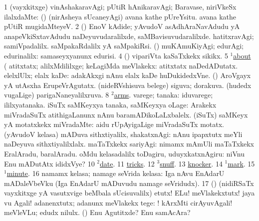 \noindent
\gl{\pagu}
\expl{}
\bmng
\bnum
\num{1}  (vayxkitxge) vinAshakaravAgi; pUtiR hAnikaravAgi; Baravase, niriVkeSx ilalxdaMte:  (\AmA) (nirAsheya sUcaneyAgi) avana kathe pUreYsitu. avana kathe pUtiR mugidaMteyeV. 
\num{2}  (\AmA) EnoV kAdide; yAvudoV asAdhAraNavAdudu yA anapeVkiSxtavAdudu naDeyuvudaralilxde, saMBavisuvudaralilxde. 
  
\banum
{} hatitxravAgi; samiVpadalilx. 
 saMpakaRdalilx yA saMpakiRsi. 
 (\AmA) muKAmuKiyAgi; edurAgi; edurinalilx:  samaseyxyanunx edurisi. 
\eanum
\numie
\num{4}  (\AmA) vipariVta kaSaTxkekx sikikx. 
\num{5}  \hyperref{kandict_a.pdf}{A}{about(1) nuga(6)}{$^1$about} (  
  
\banum
{} atitxtatx; alilxMdililxge; keLagiMda meVlakekx:  atitxtatx naDedADutatx. 
 elelxlUlx; elalx kaDe:  adakAkxgi nAnu elalx kaDe huDukidedxVne. 
 (\AmA) AroVgayx yA utAsxha ErupeVrAgutatx. 
\eanum
\numie
{}  
\banum
{} (nideRVshisuva belege) siguva; dorakuva. 
 (hudedx \mo vugaLige) parigaNaneyalilxruva. 
\eanum
\numie
\num{8}  \hyperref{kandict_a.pdf}{A}{arms(2) nuga(5)}{$^2$arms}. 
\banum
{} varege; tanaka:  iduvarege; ililxyatanaka. 
 iSuTx saMKeyxya tanaka, saMKeyxya oLage:  Arakekx miVradaSuTx atithigaLanunx nAnu baramADikoLaLxbalelx. 
 (iSuTx) saMKeyx yA motatxkekx miVradaMte:  aidu rUpAyigaLige miVradaSuTx motatx. 
 (yAvudoV kelasa) mADuva sithxtiyalilx, shakatxnAgi:  nAnu ipapxtutx meYli naDeyuva sithxtiyalilxlalx. 
 maTaTxkekx sariyAgi:  nimamx mAmUli maTaTxkekx EralAradu, baralAradu. 
 oMdu kelasadalilx toDagiru, uduyxkatxnAgiru:  niVnu Enu mADutAtx ididxVye? 
\eanum
\numie
\num{10}  \hyperref{kandict_d.pdf}{D}{date(2) nuga(3)}{$^2$date}. 
\num{11}  \hyperref{kandict_t.pdf}{T}{trick pagu(7)}{tricks}. 
\num{12}  \hyperref{kandict_s.pdf}{S}{snuff(3) pagu(3)}{$^3$snuff}. 
\num{13}  \hyperref{kandict_k.pdf}{K}{knocker nuga(2)}{knocker}. 
\num{14}  \hyperref{kandict_m.pdf}{M}{mark(1) pagu(16)}{$^1$mark}. 
\num{15}  \hyperref{kandict_m.pdf}{M}{minute(1) pagu(3)}{$^1$minute}. 
\num{16}  namamx kelasa; namage seVrida kelasa:  Iga nAvu EnAdarU mADaleVbeVku (Iga EnAdarU mADuvudu namage seVridudx). 
\num{17}  (\BAavayx) (nidiRSaTx vayxkitxge yA vasutxvige beMbala sUcisuvalilx) etutx! ELu! meVlakekxtutx! jaya \mo vu Agali! adanenxtutx; adanunx meVlakekx tege: ! kArxMti cirAyuvAgali!  meVleVLu; edudx nilulx. 
  (\AmA) 
\banum
{} Enu Agutitxde? 
 Enu samAcAra? 
\eanum
\numie
\enum
\emng
\eentry

